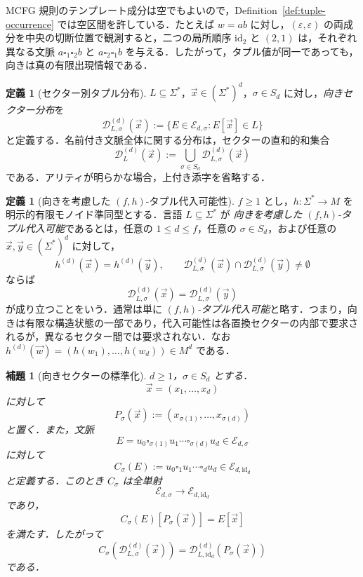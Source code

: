 \documentclass[11pt,a4paper]{ltjsarticle}
\numberwithin{equation}{section}
\theoremstyle{plain}
\newtheorem{lemma}[theorem]{補題}
\theoremstyle{definition}
\newtheorem{definition}[theorem]{定義}
\theoremstyle{remark}
\newcommand{\D}{\mathcal{D}}
\newcommand{\tuple}[1]{\vec{#1}}
\newcommand{\blank}{\square}
\newcommand{\eps}{\varepsilon}
\begin{document}
MCFG 規則のテンプレート成分は空でもよいので，Definition~\ref{def:tuple-occurrence} では空区間を許している．たとえば $w=ab$ に対し，$(\eps,\eps)$ の両成分を中央の切断位置で観測すると，二つの局所順序 $\mathrm{id}_2$ と $(2,1)$ は，それぞれ異なる文脈
$a\blank_1\blank_2b$ と $a\blank_2\blank_1b$ を与える．したがって，タプル値が同一であっても，向きは真の有限出現情報である．

\begin{definition}[セクター別タプル分布]
\label{def:tuple-distribution}
$L\subseteq\Sigma^*$，$\tuple x\in(\Sigma^*)^d$，$\sigma\in S_d$ に対し，\emph{向きセクター分布}を
\[
  \D_{L,\sigma}^{(d)}(\tuple x)
  :=
  \{E\in\mathcal E_{d,\sigma}:E[\tuple x]\in L\}
\]
と定義する．名前付き文脈全体に関する分布は，セクターの直和的和集合
\[
  \D_L^{(d)}(\tuple x)
  :=\bigcup_{\sigma\in S_d}\D_{L,\sigma}^{(d)}(\tuple x)
\]
である．アリティが明らかな場合，上付き添字を省略する．
\end{definition}

\begin{definition}[向きを考慮した $(f,h)$-タプル代入可能性]
\label{def:tuple-substitutable}
$f\ge1$ とし，$h\colon\Sigma^*\to M$ を明示的有限モノイド準同型とする．言語 $L\subseteq\Sigma^*$ が \emph{向きを考慮した $(f,h)$-タプル代入可能}であるとは，任意の $1\le d\le f$，任意の $\sigma\in S_d$，および任意の
$\tuple x,\tuple y\in(\Sigma^*)^d$ に対して，
\[
 h^{(d)}(\tuple x)=h^{(d)}(\tuple y),\qquad
 \D_{L,\sigma}^{(d)}(\tuple x)\cap
 \D_{L,\sigma}^{(d)}(\tuple y)\ne\emptyset
\]
ならば
\[
  \D_{L,\sigma}^{(d)}(\tuple x)
  =\D_{L,\sigma}^{(d)}(\tuple y)
\]
が成り立つことをいう．通常は単に \emph{$(f,h)$-タプル代入可能}と略す．つまり，向きは有限な構造状態の一部であり，代入可能性は各置換セクターの内部で要求されるが，異なるセクター間では要求されない．なお
$h^{(d)}(\tuple w)=(h(w_1),\ldots,h(w_d))\in M^d$ である．
\end{definition}

\begin{lemma}[向きセクターの標準化]
\label{lem:sector-canonicalization}
$d\ge1$，$\sigma\in S_d$ とする．
\[
  \tuple x=(x_1,\ldots,x_d)
\]
に対して
\[
  P_\sigma(\tuple x):=(x_{\sigma(1)},\ldots,x_{\sigma(d)})
\]
と置く．また，文脈
\[
  E=u_0\blank_{\sigma(1)}u_1\cdots\blank_{\sigma(d)}u_d
  \in\mathcal E_{d,\sigma}
\]
に対して
\[
  C_\sigma(E):=u_0\blank_1u_1\cdots\blank_du_d
  \in\mathcal E_{d,\mathrm{id}_d}
\]
と定義する．このとき $C_\sigma$ は全単射
\[
  \mathcal E_{d,\sigma}\longrightarrow\mathcal E_{d,\mathrm{id}_d}
\]
であり，
\[
  C_\sigma(E)[P_\sigma(\tuple x)]=E[\tuple x]
\]
を満たす．したがって
\[
  C_\sigma\!\left(\D_{L,\sigma}^{(d)}(\tuple x)\right)
  =
  \D_{L,\mathrm{id}_d}^{(d)}\!\left(P_\sigma(\tuple x)\right)
\]
である．
\end{lemma}
\end{document}
